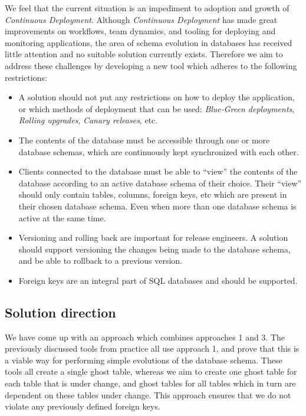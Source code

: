\documentclass[conference]{IEEEtran}
\begin{document}
We feel that the current situation is an impediment to adoption and growth of \textit{Continuous Deployment}. Although \textit{Continuous Deployment} has made great improvements on workflows, team dynamics, and tooling for deploying and monitoring applications, the area of schema evolution in databases has received little attention and no suitable solution currently exists. Therefore we aim to address these challenges by developing a new tool which adheres to the following restrictions:

\begin{itemize}
  \item{A solution should not put any restrictions on how to deploy the application, or which methods of deployment that can be used: \textit{Blue-Green deployments}, \textit{Rolling upgrades}, \textit{Canary releases}, etc.}
  \item{The contents of the database must be accessible through one or more database schemas, which are continuously kept synchronized with each other.}
  \item{Clients connected to the database must be able to ``view'' the contents of the database according to an active database schema of their choice. Their ``view'' should only contain tables, columns, foreign keys, etc which are present in their chosen database schema. Even when more than one database schema is active at the same time.}
  \item{Versioning and rolling back are important for release engineers. A solution should support versioning the changes being made to the database schema, and be able to rollback to a previous version.}
  \item{Foreign keys are an integral part of SQL databases and should be supported.}
\end{itemize}

\subsection{Solution direction}

We have come up with an approach which combines approaches 1 and 3. The previously discussed tools from practice all use approach 1, and prove that this is a viable way for performing simple evolutions of the database schema. These tools all create a single ghost table, whereas we aim to create one ghost table for each table that is under change, and ghost tables for all tables which in turn are dependent on these tables under change. This approach ensures that we do not violate any previously defined foreign keys.
\end{document}
